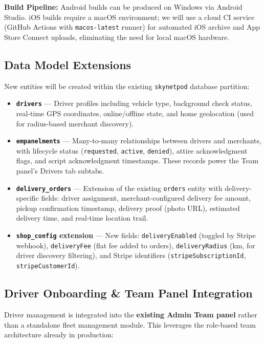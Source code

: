 \documentclass[11pt, letterpaper]{article}
\begin{document}
\begin{recommendbox}
\textbf{Build Pipeline:} Android builds can be produced on Windows via Android Studio. iOS builds require a macOS environment; we will use a cloud CI service (GitHub Actions with \texttt{macos-latest} runner) for automated iOS archive and App Store Connect uploads, eliminating the need for local macOS hardware.
\end{recommendbox}

\subsection{Data Model Extensions}
New entities will be created within the existing \texttt{skynetpod} database partition:

\begin{itemize}
    \item \textbf{\texttt{drivers}} --- Driver profiles including vehicle type, background check status, real-time GPS coordinates, online/offline state, and home geolocation (used for radius-based merchant discovery).
    \item \textbf{\texttt{empanelments}} --- Many-to-many relationships between drivers and merchants, with lifecycle status (\texttt{requested}, \texttt{active}, \texttt{denied}), attire acknowledgment flags, and script acknowledgment timestamps. These records power the Team panel's Drivers tab subtabs.
    \item \textbf{\texttt{delivery\_orders}} --- Extension of the existing \texttt{orders} entity with delivery-specific fields: driver assignment, merchant-configured delivery fee amount, pickup confirmation timestamp, delivery proof (photo URL), estimated delivery time, and real-time location trail.
    \item \textbf{\texttt{shop\_config} extension} --- New fields: \texttt{deliveryEnabled} (toggled by Stripe webhook), \texttt{deliveryFee} (flat fee added to orders), \texttt{deliveryRadius} (km, for driver discovery filtering), and Stripe identifiers (\texttt{stripeSubscriptionId}, \texttt{stripeCustomerId}).
\end{itemize}

\subsection{Driver Onboarding \& Team Panel Integration}
Driver management is integrated into the \textbf{existing Admin Team panel} rather than a standalone fleet management module. This leverages the role-based team architecture already in production:
\end{document}

